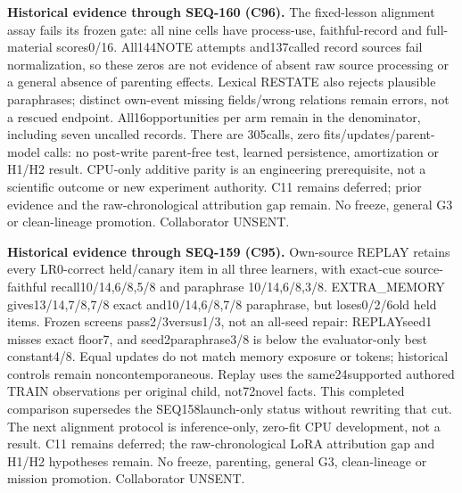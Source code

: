 \documentclass[11pt]{article}
\begin{document}
\noindent\textbf{Historical evidence through SEQ-160 (C96).}
The fixed-lesson alignment assay fails its frozen gate: all nine cells have
process-use, faithful-record and full-material scores0/16. All144NOTE attempts
and137called record sources fail normalization, so these zeros are not evidence
of absent raw source processing or a general absence of parenting effects.
Lexical RESTATE also rejects plausible paraphrases; distinct own-event missing
fields/wrong relations remain errors, not a rescued endpoint. All16opportunities
per arm remain in the denominator, including seven uncalled records. There are
305calls, zero fits/updates/parent-model calls: no post-write parent-free test, learned
persistence, amortization or H1/H2 result. CPU-only additive parity is an
engineering prerequisite, not a scientific outcome or new experiment authority.
C11 remains deferred; prior evidence and the raw-chronological attribution gap
remain. No freeze, general G3 or clean-lineage promotion. Collaborator UNSENT.

\noindent\textbf{Historical evidence through SEQ-159 (C95).}
Own-source REPLAY retains every LR0-correct held/canary item in all three
learners, with exact-cue source-faithful recall10/14,6/8,5/8 and paraphrase
10/14,6/8,3/8. EXTRA\_MEMORY gives13/14,7/8,7/8 exact and10/14,6/8,7/8
paraphrase, but loses0/2/6old held items. Frozen screens pass2/3versus1/3,
not an all-seed repair: REPLAYseed1 misses exact floor7, and seed2paraphrase3/8
is below the evaluator-only best constant4/8. Equal updates do not match memory
exposure or tokens; historical controls remain noncontemporaneous. Replay uses
the same24supported authored TRAIN observations per original child, not72novel
facts. This completed comparison supersedes the SEQ158launch-only status without
rewriting that cut. The next alignment protocol is inference-only, zero-fit CPU
development, not a result. C11 remains deferred; the raw-chronological LoRA
attribution gap and H1/H2 hypotheses remain. No freeze, parenting, general G3,
clean-lineage or mission promotion. Collaborator UNSENT.
\end{document}
